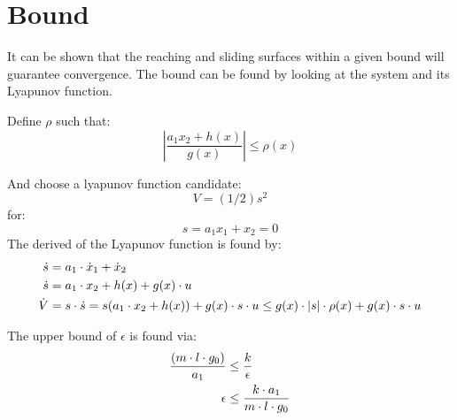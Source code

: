 \section{Bound} %
\label{sec:bound}
It can be shown that the reaching and sliding surfaces within a given bound will guarantee convergence. The bound can be found by looking at the system and its Lyapunov function.



Define $\rho$ such that:
\begin{equation}
        \left \vert \frac{a_1 x_2 + h(x)}{g(x)} \right \vert \leq \rho(x) 
\end{equation}

And choose a lyapunov function candidate:
\begin{equation}
        V=(1/2)s^2
\end{equation}
for:
\begin{equation}
        s=a_1 x_1+ x_2 = 0
\end{equation}
The derived of the Lyapunov function is found by:
\begin{equation}
        \begin{split}
                \dot{s} &= a_1 \cdot \dot{x}_1 + \dot{x}_2 \\
                \dot{s} &= a_1 \cdot x_2 + h(x) + g(x) \cdot u\\
                \dot{V} &= s \cdot \dot{s} = s(a_1 \cdot x_2+ h(x)) + g(x) \cdot s \cdot u \leq g(x) \cdot \vert s \vert \cdot \rho(x) + g(x) \cdot s\cdot u
        \end{split}
\end{equation}
        

The upper bound of $\epsilon$ is found via:
\begin{equation}
        \begin{split}
                \frac{(m \cdot l \cdot g_0)}{a_1} &\leq \frac{k}{\epsilon} \\
                \epsilon &\leq \frac{k \cdot a_1}{m \cdot l \cdot g_0}    
        \end{split}
\end{equation}

